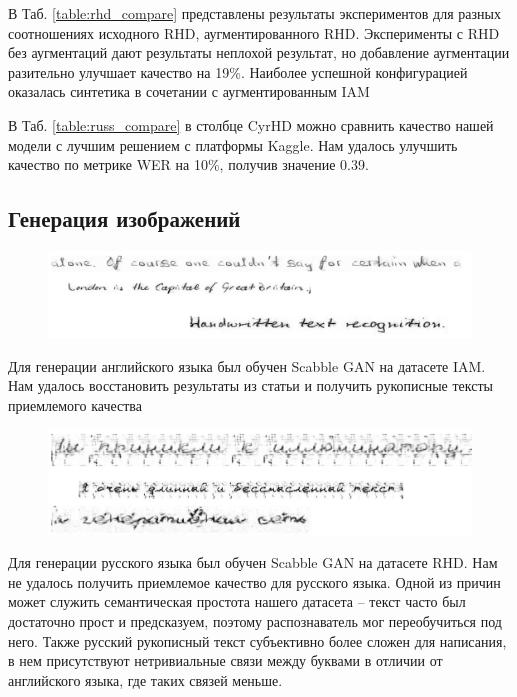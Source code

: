 \documentclass[12pt]{article}
\begin{document}
В Таб. \ref{table:rhd_compare} представлены результаты экспериментов для разных соотношениях
исходного RHD, аугментированного RHD.
Эксперименты с RHD без аугментаций дают результаты неплохой результат,
но добавление аугментации разительно улучшает качество на 19\%.
Наиболее успешной конфигурацией оказалась синтетика  в сочетании с аугментированным IAM

В Таб. \ref{table:russ_compare} в столбце CyrHD можно сравнить качество нашей модели с лучшим решением
с платформы Kaggle. Нам удалось улучшить качество по метрике WER на 10\%, получив значение 0.39.


\subsection{Генерация изображений}
\begin{figure}[htb]
    \centering
    \includegraphics[width=\linewidth]{english_gan.png}
    \label{fig:english_gan}
\end{figure}
Для генерации английского языка был обучен Scabble GAN на датасете IAM. Нам удалось восстановить результаты
из статьи и получить рукописные тексты приемлемого качества


\begin{figure}[htb]
    \centering
    \includegraphics[width=\linewidth]{russian_gan.png}
    \label{fig:english_gan}
\end{figure}
Для генерации русского языка был обучен Scabble GAN на датасете RHD.
Нам не удалось получить приемлемое качество для русского языка. Одной из причин может служить семантическая простота 
нашего датасета -- текст часто был достаточно прост и предсказуем, поэтому
распознаватель мог переобучиться под него. Также русский рукописный текст субъективно более сложен для написания,
в нем присутствуют нетривиальные связи между буквами в отличии от английского языка, где таких связей меньше.
\end{document}
